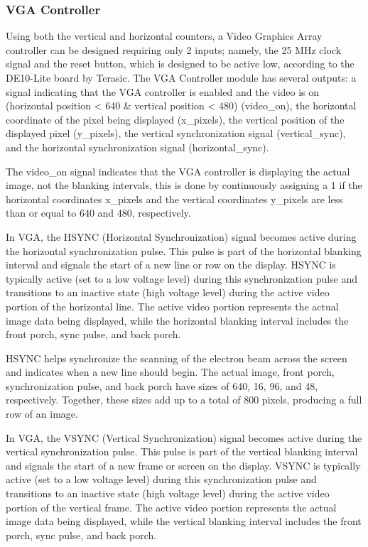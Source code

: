 \subsubsection{VGA Controller}
\par Using both the vertical and horizontal counters, a Video Graphics Array controller can be designed requiring only 2 inputs; namely, the 25 MHz clock signal and the reset button, which is designed to be active low, according to the DE10-Lite board by Terasic. The VGA Controller module has several outputs: a signal indicating that the VGA controller is enabled and the video is on (horizontal position < 640 \& vertical position < 480) (video\_on), the horizontal coordinate of the pixel being displayed (x\_pixels), the vertical position of the displayed pixel (y\_pixels), the vertical synchronization signal (vertical\_sync), and the horizontal synchronization signal (horizontal\_sync). \newline
\par The video\_on signal indicates that the VGA controller is displaying the actual image, not the blanking intervals, this is done by continuously assigning a 1 if the horizontal coordinates x\_pixels and the vertical coordinates y\_pixels are less than or equal to 640 and 480, respectively. \newline
\par In VGA, the HSYNC (Horizontal Synchronization) signal becomes active during the horizontal synchronization pulse. This pulse is part of the horizontal blanking interval and signals the start of a new line or row on the display. HSYNC is typically active (set to a low voltage level) during this synchronization pulse and transitions to an inactive state (high voltage level) during the active video portion of the horizontal line. The active video portion represents the actual image data being displayed, while the horizontal blanking interval includes the front porch, sync pulse, and back porch. \newline
\par HSYNC helps synchronize the scanning of the electron beam across the screen and indicates when a new line should begin. The actual image, front porch, synchronization pulse, and back porch have sizes of 640, 16, 96, and 48, respectively. Together, these sizes add up to a total of 800 pixels, producing a full row of an image. \newline
\par In VGA, the VSYNC (Vertical Synchronization) signal becomes active during the vertical synchronization pulse. This pulse is part of the vertical blanking interval and signals the start of a new frame or screen on the display. VSYNC is typically active (set to a low voltage level) during this synchronization pulse and transitions to an inactive state (high voltage level) during the active video portion of the vertical frame. The active video portion represents the actual image data being displayed, while the vertical blanking interval includes the front porch, sync pulse, and back porch.\newline
